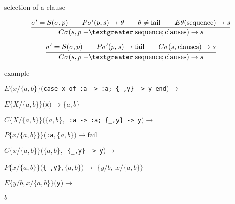 \begin{frame}{selection of a clause}

$$\frac{
  \sigma' = S(\sigma, p) \qquad
  P\sigma'(p, s) \rightarrow \theta \qquad
  \theta \not = {\rm fail} \qquad
  E\theta({\rm sequence}) \rightarrow s}{
C\sigma(s, p \;{\rm -\textgreater}\;    {\rm sequence} ; {\rm clauses}) \rightarrow s}$$

\pause \vspace{10pt}

$$\frac{
  \sigma' = S(\sigma, p) \qquad
  P\sigma'(p, s) \rightarrow {\rm fail} \qquad
  C\sigma(s, {\rm clauses}) \rightarrow s}{
C\sigma(s, p \;{\rm -\textgreater}\;  {\rm sequence} ; {\rm clauses}) \rightarrow s}$$


\end{frame}

\begin{frame}{example}

\begin{eval}
  \pause$E\lbrace x/\lbrace a,b\rbrace\rbrace(${\tt case x of :a -> :a; \{\_,y\} -> y end}$) \rightarrow$ 
\end{eval}

\begin{eval}
   \hspace{40pt}\pause$E\lbrace X/\lbrace a,b\rbrace\rbrace(${\tt x}$) \rightarrow \lbrace a,b\rbrace$
\end{eval}

\begin{eval}
   \pause $C\lbrace X/\lbrace a,b\rbrace\rbrace(\lbrace a,b\rbrace, ${\tt \ :a -> :a; \{\_,y\} -> y}$) \rightarrow$ 
\end{eval}
\begin{eval}
   \hspace{40pt}\pause $P\lbrace x/\lbrace a,b\rbrace\rbrace\rbrace( ${\tt :a}$, \lbrace a,b\rbrace) \rightarrow \mathrm{fail}$
\end{eval}

\begin{eval}
   \pause $C\lbrace x/\lbrace a,b\rbrace\rbrace(\lbrace a,b\rbrace, ${\tt \  \{\_,y\} -> y}$) \rightarrow$ 
\end{eval}
\begin{eval}
   \hspace{40pt}\pause $P\lbrace x/\lbrace a,b\rbrace\rbrace(${\tt \{\_,y\}}$, \lbrace a,b\rbrace) \rightarrow $ \pause $\lbrace y/b,\  x/\lbrace a,b\rbrace\rbrace$
\end{eval}

\begin{eval}
  \pause$E\lbrace y/b, x/\lbrace a,b\rbrace\rbrace(${\tt y}$) \rightarrow $
\end{eval}
\begin{eval}
  \pause$b$
\end{eval}
  
\end{frame}



